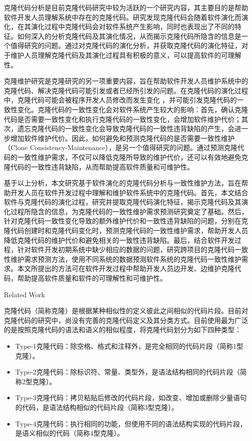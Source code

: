 克隆代码分析是目前克隆代码研究中较为活跃的一个研究内容，其主要目的是帮助软件开发人员理解系统中存在的克隆代码。研究发现克隆代码会随着软件演化而演化\cite{kim2005empirical,saha2011automatic}，在其演化过程中克隆代码会对软件系统产生影响，同时也表现出了不同的特征\cite{gode2011frequency,mondal2012dispersion,rahman2014change}。如何深入的分析克隆代码及其演化情况，从而揭示克隆代码所隐含的信息是一个值得研究的问题。通过对克隆代码的演化分析，并获取克隆代码的演化特征，对于维护人员理解克隆代码及其演化过程具有积极的意义，可以提高软件的可理解性。

克隆维护研究是克隆研究的另一项重要内容，旨在帮助软件开发人员维护系统中的克隆代码、解决克隆代码可能引发或者已经所引发的问题。在克隆代码的演化过程中，克隆代码可能会被程序开发人员修改而发生变化 ，并可能引发克隆代码的一致性变化\cite{krinke2007study,aversano2007clones}。克隆代码的一致性变化会对软件系统产生较大的影响：首先，确认克隆代码是否需要一致性变化和执行克隆代码的一致性变化，会增加软件维护代价；其次，遗忘克隆代码的一致性变化会导致克隆代码的一致性违背缺陷的产生\cite{juergens2009code,wagner2016relationship}，会进一步增加软件维护代价。因此，如何避免和预测克隆代码的是否需要一致性维护（Clone Consistency-Maintenance），是另一个值得研究的问题。通过预测克隆代码的一致性维护需求，不仅可以降低克隆所导致的维护代价，还可以有效地避免克隆代码的一致性违背缺陷，从而帮助提高软件质量和可维护性。

基于以上分析，本文研究基于软件演化的克隆代码分析与一致性维护方法，旨在帮助开发人员在软件开发过程中理解和维护软件系统中的克隆代码。首先，本文结合软件与克隆代码的演化过程，研究并提取克隆代码演化特征，揭示克隆代码及其演化过程所隐含的信息，为克隆代码的一致性维护需求预测研究奠定了基础。然后，针对克隆代码一致性变化导致的额外维护代价和一致性违背缺陷的问题，分别在克隆代码创建时和克隆代码变化时，预测克隆代码的一致性维护需求，帮助开发人员降低克隆代码的维护代价和避免相关的一致性违背缺陷。最后，结合软件开发过程，针对软件开发初期系统中缺少相应的数据的问题，研究跨项目的克隆代码一致性维护需求预测方法，使用不同系统的数据预测软件系统的克隆代码一致性维护需求。本文所提出的方法可在软件开发过程中帮助开发人员边开发、边维护克隆代码，帮助提高软件质量和软件的可理解性和可维护性。


{Related Work}

克隆代码（简称克隆）是根据某种相似性的定义彼此之间相似的代码片段\cite{roy2007survey}。目前对克隆代码的研究中，尚没有完善的克隆代码定义及其分类方式。目前使用最为广泛的是按照克隆代码的语法和语义的相似程度，将克隆代码划分为如下四种类型\cite{koschke2007survey}：
\begin{itemize}
\item 
Type-1克隆代码：除空格、格式和注释外，是完全相同的代码片段（简称1型克隆）。
\item 
Type-2克隆代码：除标识符、常量、类型外，是语法结构相同的代码片段（简称2型克隆）。
\item 
Type-3克隆代码：拷贝粘贴后修改的代码片段，如改变、增加或删除少量语句的代码，是语法结构相似的代码片段（简称3型克隆）。
\item 
Type-4克隆代码：执行相同的功能，但使用不同的语法结构实现的代码片段，是语义相似的代码（简称4型克隆）。
\end{itemize}

